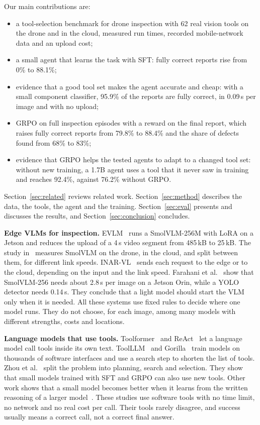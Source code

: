 \documentclass[final,5p,times,twocolumn]{elsarticle}
\makeatletter
\renewcommand\section{\@startsection{section}{1}{\z@}{-16pt plus -3pt minus -2pt}{8pt}{\normalfont\normalsize\bfseries}}
\makeatother
\begin{document}
Our main contributions are:
\begin{itemize}
\item a tool-selection benchmark for drone inspection with 62 real vision tools on the drone and in the cloud, measured run times, recorded mobile-network data and an upload cost;
\item a small agent that learns the task with SFT: fully correct reports rise from 0\% to 88.1\%;
\item evidence that a good tool set makes the agent accurate and cheap: with a small component classifier, 95.9\% of the reports are fully correct, in 0.09\,s per image and with no upload;
\item GRPO on full inspection episodes with a reward on the final report, which raises fully correct reports from 79.8\% to 88.4\% and the share of defects found from 68\% to 83\%;
\item evidence that GRPO helps the tested agents to adapt to a changed tool set: without new training, a 1.7B agent uses a tool that it never saw in training and reaches 92.4\%, against 76.2\% without GRPO.
\end{itemize}

Section~\ref{sec:related} reviews related work. Section~\ref{sec:method} describes the data, the tools, the agent and the training. Section~\ref{sec:eval} presents and discusses the results, and Section~\ref{sec:conclusion} concludes.

\section{Related Work}
\label{sec:related}

\textbf{Edge VLMs for inspection.} EVLM~\cite{evlm} runs a SmolVLM-256M with LoRA on a Jetson and reduces the upload of a 4\,s video segment from 485\,kB to 25\,kB. The study in~\cite{splitvlm} measures SmolVLM on the drone, in the cloud, and split between them, for different link speeds. INAR-VL~\cite{inarvl} sends each request to the edge or to the cloud, depending on the input and the link speed. Farahani et al.~\cite{p2s} show that SmolVLM-256 needs about 2.8\,s per image on a Jetson Orin, while a YOLO detector needs 0.14\,s. They conclude that a light model should start the VLM only when it is needed. All these systems use fixed rules to decide where one model runs. They do not choose, for each image, among many models with different strengths, costs and locations.

\textbf{Language models that use tools.} Toolformer~\cite{toolformer} and ReAct~\cite{react} let a language model call tools inside its own text. ToolLLM~\cite{toolllm} and Gorilla~\cite{gorilla} train models on thousands of software interfaces and use a search step to shorten the list of tools. Zhou et al.~\cite{zhou2026} split the problem into planning, search and selection. They show that small models trained with SFT and GRPO can also use new tools. Other work shows that a small model becomes better when it learns from the written reasoning of a larger model~\cite{distill}. These studies use software tools with no time limit, no network and no real cost per call. Their tools rarely disagree, and success usually means a correct call, not a correct final answer.
\end{document}
